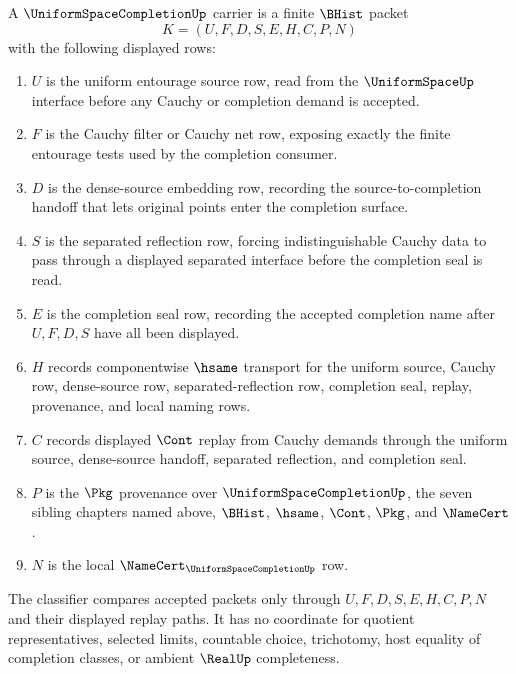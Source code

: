 \begin{definition}
\label{def:uniform-space-completion-carrier}
A $\UniformSpaceCompletionUp$ carrier is a finite $\BHist$ packet
$$
K=(U,F,D,S,E,H,C,P,N)
$$
with the following displayed rows:
\begin{enumerate}
\item $U$ is the uniform entourage source row, read from the $\UniformSpaceUp$ interface before any Cauchy or completion demand is accepted.
\item $F$ is the Cauchy filter or Cauchy net row, exposing exactly the finite entourage tests used by the completion consumer.
\item $D$ is the dense-source embedding row, recording the source-to-completion handoff that lets original points enter the completion surface.
\item $S$ is the separated reflection row, forcing indistinguishable Cauchy data to pass through a displayed separated interface before the completion seal is read.
\item $E$ is the completion seal row, recording the accepted completion name after $U,F,D,S$ have all been displayed.
\item $H$ records componentwise $\hsame$ transport for the uniform source, Cauchy row, dense-source row, separated-reflection row, completion seal, replay, provenance, and local naming rows.
\item $C$ records displayed $\Cont$ replay from Cauchy demands through the uniform source, dense-source handoff, separated reflection, and completion seal.
\item $P$ is the $\Pkg$ provenance over $\UniformSpaceCompletionUp$, the seven sibling chapters named above, $\BHist$, $\hsame$, $\Cont$, $\Pkg$, and $\NameCert$.
\item $N$ is the local $\NameCert_{\UniformSpaceCompletionUp}$ row.
\end{enumerate}
The classifier compares accepted packets only through $U,F,D,S,E,H,C,P,N$ and their displayed replay paths. It has no coordinate for quotient representatives, selected limits, countable choice, trichotomy, host equality of completion classes, or ambient $\RealUp$ completeness.
\end{definition}

